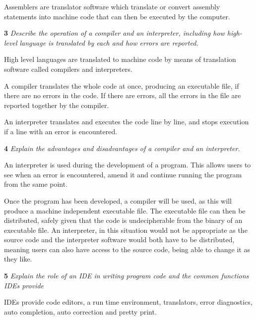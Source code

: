 Assemblers are translator software which translate or convert assembly statements into machine code
that can then be executed by the computer.

\bigskip

\noindent\textbf{3} \textit{Describe the operation of a compiler and an
interpreter, including how high-level language is
translated by each and how errors are reported.}

High level languages are translated to machine code by means of translation software called
compilers and interpreters.

A compiler translates the whole code at once, producing an executable file, if there are no errors
in the code. If there are errors, all the errors in the file are reported together by the compiler.

An interpreter translates and executes the code line by line, and stops execution if a line with
an error is encountered.

\bigskip

\noindent\textbf{4} \textit{Explain the advantages and disadvantages of a
compiler and an interpreter.}

An interpreter is used during the development of a program. This allows users to see when an error
is encountered, amend it and continue running the program from the same point. 

Once the program has been developed, a compiler will be used, as this will produce a machine
independent executable file. The executable file can then be distributed, safely given that the
code is undecipherable from the binary of an executable file. An interpreter, in this situation
would not be appropriate as the source code and the interpreter software would both have to be
distributed, meaning users can also have access to the source code, being able to change it as they
like.

\noindent\textbf{5} \textit{Explain the role of an IDE in writing program code
and the common functions IDEs provide}

IDEs provide code editors, a run time environment, translators, error diagnostics, auto completion,
auto correction and pretty print.
